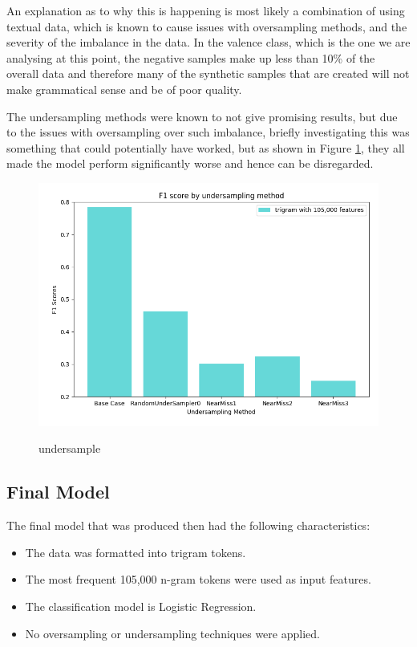 An explanation as to why this is happening is most likely a combination of using textual data, which is known to cause issues with oversampling methods, and the severity of the imbalance in the data. In the valence class, which is the one we are analysing at this point, the negative samples make up less than 10\% of the overall data and therefore many of the synthetic samples that are created will not make grammatical sense and be of poor quality. 


The undersampling methods were known to not give promising results, but due to the issues with oversampling over such imbalance, briefly investigating this was something that could potentially have worked, but as shown in Figure \ref{undersamplegraph}, they all made the model perform significantly worse and hence can be disregarded.

\begin{figure}[ht]
\caption{undersample}
\centering
\includegraphics[scale=0.7]{graphs/undersample.png}
\label{undersamplegraph}
\end{figure}

\pagebreak

\subsection{Final Model}

The final model that was produced then had the following characteristics: 

\begin{itemize}
    \item The data was formatted into trigram tokens.
    \item The most frequent 105,000 n-gram tokens were used as input features.
    \item The classification model is Logistic Regression.
    \item No oversampling or undersampling techniques were applied.
\end{itemize}

